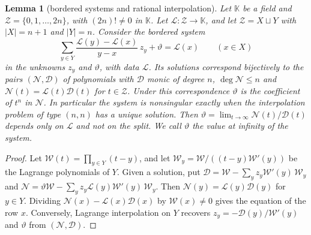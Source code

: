 \documentclass[11pt]{amsart}
\newtheorem{lemma}[theorem]{Lemma}
\theoremstyle{definition}
\theoremstyle{remark}
\numberwithin{equation}{section}
\begin{document}
\begin{lemma}[bordered systems and rational interpolation]\label{lem:interp}
Let $\mathbb K$ be a field and $\mathcal Z=\{0,1,\dots,2n\}$, with $(2n)!\ne0$ in $\mathbb K$. Let
$\mathcal L:\mathcal Z\to\mathbb K$, and let $\mathcal Z=X\sqcup Y$ with $|X|=n+1$ and $|Y|=n$. Consider the bordered
system
\[
 \sum_{y\in Y}\frac{\mathcal L(y)-\mathcal L(x)}{y-x}\,z_y+\vartheta=\mathcal L(x)\qquad(x\in X)
\]
in the unknowns $z_y$ and $\vartheta$, with data $\mathcal L$. Its solutions correspond bijectively to the pairs $(\mathcal N,\mathcal D)$ of
polynomials with $\mathcal D$ monic of degree $n$, $\deg\mathcal N\le n$ and $\mathcal N(t)=\mathcal L(t)\mathcal D(t)$
for $t\in\mathcal Z$. Under this correspondence $\vartheta$ is the coefficient of $t^n$ in $\mathcal N$. In particular the
system is nonsingular exactly when the interpolation problem of type $(n,n)$ has a unique solution. Then
$\vartheta=\lim_{t\to\infty}\mathcal N(t)/\mathcal D(t)$ depends only on $\mathcal L$ and not on the split. We call $\vartheta$ the \emph{value at infinity} of the system.
\end{lemma}
\begin{proof}
Let $\mathcal W(t)=\prod_{y\in Y}(t-y)$, and let $\mathcal W_y=\mathcal W/((t-y)\mathcal W'(y))$ be the Lagrange
polynomials of $Y$. Given a solution, put $\mathcal D=\mathcal W-\sum_yz_y\mathcal W'(y)\,\mathcal W_y$ and
$\mathcal N=\vartheta\mathcal W-\sum_yz_y\mathcal L(y)\mathcal W'(y)\,\mathcal W_y$. Then
$\mathcal N(y)=\mathcal L(y)\mathcal D(y)$ for $y\in Y$. Dividing $\mathcal N(x)-\mathcal L(x)\mathcal D(x)$ by
$\mathcal W(x)\ne0$ gives the equation of the row $x$. Conversely, Lagrange interpolation on $Y$ recovers
$z_y=-\mathcal D(y)/\mathcal W'(y)$ and $\vartheta$ from $(\mathcal N,\mathcal D)$.
\end{proof}
\end{document}
